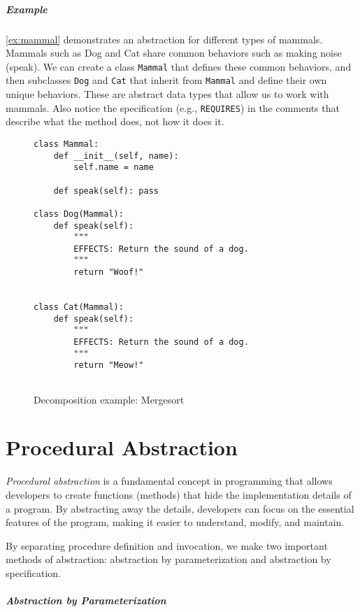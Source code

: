\documentclass[oneside,11pt,dvipsnames]{book}
\newcommand{\code}[1]{\texttt{#1}}
\begin{document}
\paragraph{Example} \autoref{ex:mammal} demonstrates an abstraction for different types of mammals. Mammals such as Dog and Cat share common behaviors such as making noise (speak). We can create a class \code{Mammal} that defines these common behaviors, and then subclasses \code{Dog} and \code{Cat} that inherit from \code{Mammal} and define their own unique behaviors.  These are abstract data types that allow us to work with mammals. Also notice the specification (e.g., \code{REQUIRES}) in the comments that describe what the method does, not how it does it.

\begin{figure}[t]
\begin{lstlisting}[multicols=2]
class Mammal:
    def __init__(self, name):
        self.name = name

    def speak(self): pass

class Dog(Mammal):
    def speak(self): 
        """
        EFFECTS: Return the sound of a dog.
        """
        return "Woof!"


class Cat(Mammal):
    def speak(self):
        """
        EFFECTS: Return the sound of a dog.
        """
        return "Meow!"
    

\end{lstlisting}
 \caption{Decomposition example: Mergesort}\label{ex:mammal}
\end{figure}

\chapter{Procedural Abstraction}\label{chap:procedural-abstraction}

\emph{Procedural abstraction} is a fundamental concept in programming that allows developers to create functions (methods) that hide the implementation details of a program. By abstracting away the details, developers can focus on the essential features of the program, making it easier to understand, modify, and maintain. 

By separating procedure definition and invocation, we make two important methods of abstraction: abstraction by parameterization and abstraction by specification.

\paragraph{Abstraction by Parameterization}
\end{document}
